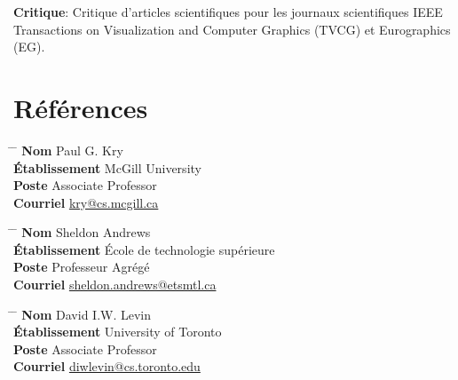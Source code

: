 \documentclass[10pt]{article} %
\begin{document}
\noindent\textbf{Critique}: Critique d'articles scientifiques pour les journaux scientifiques IEEE Transactions on Visualization and Computer Graphics (TVCG) et Eurographics (EG).


\section{Références}

\parbox{0.5\textwidth}{
\begin{tabbing}
\hspace{2.75cm} \= \hspace{4cm} \= \kill
{\bf Nom} \> Paul G. Kry\\ 
{\bf Établissement} \> McGill University\\ 
{\bf Poste} \> Associate Professor \\ 
{\bf Courriel} \> \href{mailto:kry@cs.mcgill.ca}{kry@cs.mcgill.ca}
\end{tabbing}}

\noindent\parbox{0.5\textwidth}{
\begin{tabbing}
\hspace{2.75cm} \= \hspace{4cm} \= \kill
{\bf Nom} \> Sheldon Andrews\\ 
{\bf Établissement} \> École de technologie supérieure\\ 
{\bf Poste} \>  Professeur Agrégé \\ 
{\bf Courriel} \> \href{mailto:sheldon.andrews@etsmtl.ca}{sheldon.andrews@etsmtl.ca}
\end{tabbing}}

\noindent\parbox{0.5\textwidth}{
\begin{tabbing}
\hspace{2.75cm} \= \hspace{4cm} \= \kill
{\bf Nom} \> David I.W. Levin\\ 
{\bf Établissement} \> University of Toronto\\ 
{\bf Poste} \>Associate Professor \\ 
{\bf Courriel} \> \href{mailto:diwlevin@cs.toronto.edu}{diwlevin@cs.toronto.edu}
\end{tabbing}}


\end{document}
